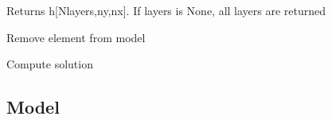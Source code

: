 \documentclass[letterpaper,10pt,english]{sphinxmanual}
\begin{document}
\begin{fulllineitems}
\begin{fulllineitems}
\label{\detokenize{models/model3d:timml.model.Model3D.headgrid2}}
Returns h{[}Nlayers,ny,nx{]}. If layers is None, all layers are returned

\end{fulllineitems}


\begin{fulllineitems}
\label{\detokenize{models/model3d:timml.model.Model3D.remove_element}}
Remove element  from model

\end{fulllineitems}


\begin{fulllineitems}
\label{\detokenize{models/model3d:timml.model.Model3D.solve}}
Compute solution

\end{fulllineitems}


\end{fulllineitems}



\subsection{Model}
\label{\detokenize{models/model::doc}}\label{\detokenize{models/model:model}}
\end{document}
